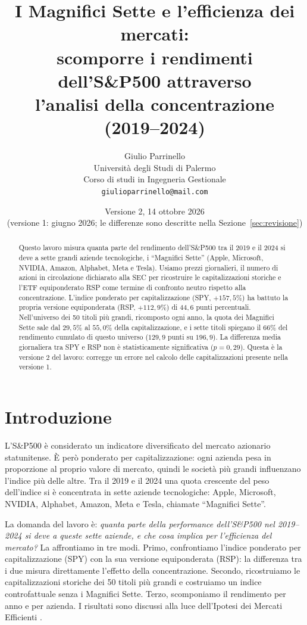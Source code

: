 \documentclass[12pt, a4paper]{article}
\title{I Magnifici Sette e l'efficienza dei mercati:\\
scomporre i rendimenti dell'S\&P500 attraverso\\
l'analisi della concentrazione (2019--2024)}
\author{
  Giulio Parrinello\\
  \small Universit\`a degli Studi di Palermo\\
  \small Corso di studi in Ingegneria Gestionale\\
  \small \texttt{giulioparrinello@mail.com}
}
\date{Versione 2, 14 ottobre 2026\\
\small (versione 1: giugno 2026; le differenze sono descritte nella Sezione~\ref{sec:revisione})}
\begin{document}
\maketitle

\begin{abstract}
Questo lavoro misura quanta parte del rendimento dell'S\&P500 tra il 2019 e il 2024 si deve a sette grandi aziende tecnologiche, i ``Magnifici Sette'' (Apple, Microsoft, NVIDIA, Amazon, Alphabet, Meta e Tesla). Usiamo prezzi giornalieri, il numero di azioni in circolazione dichiarato alla SEC per ricostruire le capitalizzazioni storiche e l'ETF equiponderato RSP come termine di confronto neutro rispetto alla concentrazione. L'indice ponderato per capitalizzazione (SPY, $+157{,}5\%$) ha battuto la propria versione equiponderata (RSP, $+112{,}9\%$) di $44{,}6$ punti percentuali. Nell'universo dei 50 titoli pi\`u grandi, ricomposto ogni anno, la quota dei Magnifici Sette sale dal $29{,}5\%$ al $55{,}0\%$ della capitalizzazione, e i sette titoli spiegano il $66\%$ del rendimento cumulato di questo universo ($129{,}9$ punti su $196{,}9$). La differenza media giornaliera tra SPY e RSP non \`e statisticamente significativa ($p = 0{,}29$). Questa \`e la versione 2 del lavoro: corregge un errore nel calcolo delle capitalizzazioni presente nella versione 1.
\end{abstract}

\section{Introduzione}

L'S\&P500 \`e considerato un indicatore diversificato del mercato azionario statunitense. \`E per\`o ponderato per capitalizzazione: ogni azienda pesa in proporzione al proprio valore di mercato, quindi le societ\`a pi\`u grandi influenzano l'indice pi\`u delle altre. Tra il 2019 e il 2024 una quota crescente del peso dell'indice si \`e concentrata in sette aziende tecnologiche: Apple, Microsoft, NVIDIA, Alphabet, Amazon, Meta e Tesla, chiamate ``Magnifici Sette''.

La domanda del lavoro \`e: \emph{quanta parte della performance dell'S\&P500 nel 2019--2024 si deve a queste sette aziende, e che cosa implica per l'efficienza del mercato?} La affrontiamo in tre modi. Primo, confrontiamo l'indice ponderato per capitalizzazione (SPY) con la sua versione equiponderata (RSP): la differenza tra i due misura direttamente l'effetto della concentrazione. Secondo, ricostruiamo le capitalizzazioni storiche dei 50 titoli pi\`u grandi e costruiamo un indice controfattuale senza i Magnifici Sette. Terzo, scomponiamo il rendimento per anno e per azienda. I risultati sono discussi alla luce dell'Ipotesi dei Mercati Efficienti \citep{fama1970, fama1991}.
\end{document}
